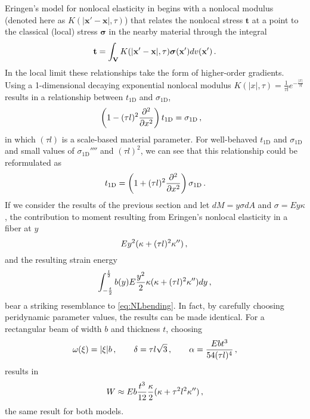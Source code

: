 Eringen's model for nonlocal elasticity in \cite{eringen1983differential} begins with a nonlocal modulus (denoted here as \(K(|\mathbf{x}'-\mathbf{x}|,\tau)\)) that relates the nonlocal stress \(\mathbf{t}\) at a point to the classical (local) stress \(\boldsymbol{\sigma}\) in the nearby material through the integral
\begin{equation}
\mathbf{t} = \int_\mathbf{V} K(|\mathbf{x}'-\mathbf{x}|,\tau)\boldsymbol{\sigma}(\mathbf{x}')dv(\mathbf{x}')\, .\notag
\end{equation}
In the local limit these relationships take the form of higher-order gradients.
Using a 1-dimensional decaying exponential nonlocal modulus \(K(|x|,\tau)=\frac{1}{\tau l}e^{-\frac{|x|}{\tau l}}\) results in a relationship between \(t_\text{1D}\) and \(\sigma_\text{1D}\),
\begin{align}
\left(1-(\tau l)^2\frac{\partial^2}{\partial x^2}\right)t_\text{1D}&=\sigma_\text{1D}\, ,\notag
\end{align}
in which \((\tau l)\) is a scale-based material parameter.
For well-behaved \(t_\text{1D}\) and \(\sigma_\text{1D}\) and small values of \(\sigma_\text{1D}''''\) and \((\tau l)^2\), we can see that this relationship could be reformulated as
\begin{equation}
\label{eq:NLstress}
t_\text{1D}=\left(1+(\tau l)^2\frac{\partial^2}{\partial x^2}\right)\sigma_\text{1D}\, .\notag
\end{equation}
If we consider the results of the previous section and let \(dM = y\sigma dA\) and \(\sigma = Ey\kappa\), the contribution to moment resulting from Eringen's nonlocal elasticity in a fiber at \(y\)
\begin{equation}
\label{eq:EringenMoment}
E y^2 (\kappa+(\tau l)^2\kappa'')\, , \\
\end{equation}
and the resulting strain energy
\begin{equation}
\label{eq:EringenEnergy}
\int_{-\frac{t}{2}}^{\frac{t}{2}} b(y) E \frac{y^2}{2} \kappa (\kappa+(\tau l)^2\kappa'')  dy\, ,\notag
\end{equation}
bear a striking resemblance to \cref{eq:NLbending}.
In fact, by carefully choosing peridynamic parameter values, the results can be made identical.
For a rectangular beam of width \(b\) and thickness \(t\), choosing 
\begin{equation}
\omega(\xi) = |\xi|b\,,\qquad \delta = \tau l \sqrt{3}\,,\qquad \alpha = \frac{E b t^3}{54 (\tau l)^4}\,,\notag
\end{equation}
results in
\begin{equation}
W \approx E b \frac{t^3}{12} \frac{\kappa}{2}(\kappa+\tau^2 l^2 \kappa'')\, , \notag
\end{equation}
the same result for both models.

